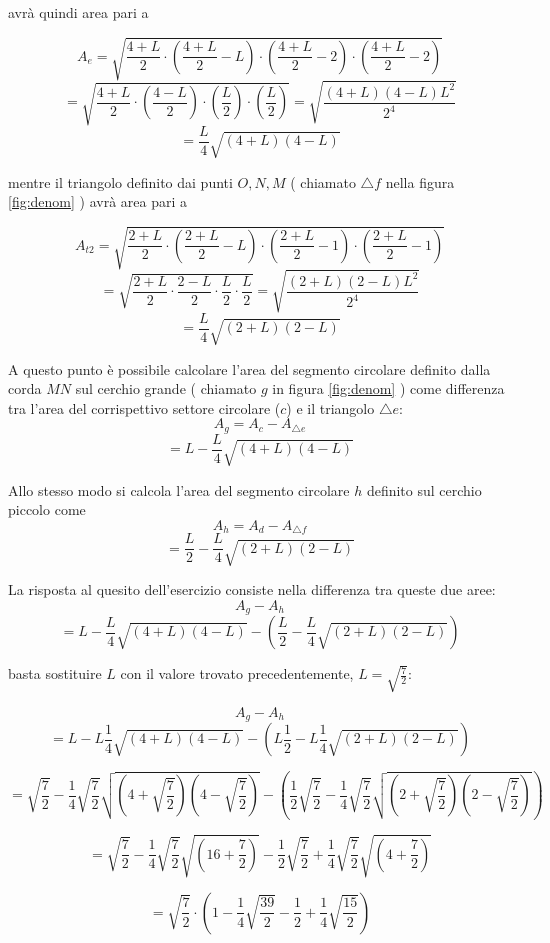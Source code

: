 avrà quindi area pari a 

\[A_{e}=\sqrt{
\frac{4+L}{2}
\cdot\left(\frac{4+L}{2}-L\right)
\cdot\left(\frac{4+L}{2}-2\right)
\cdot\left(\frac{4+L}{2}-2\right)
}\]
\[=\sqrt{
\frac{4+L}{2}
\cdot\left(\frac{4-L}{2}\right)
\cdot\left(\frac{L}{2}\right)
\cdot\left(\frac{L}{2}\right)
}
=\sqrt{
\frac{
(4+L)(4-L)L^2
}{2^4}
}\]
\[=\frac{L}{4}\sqrt{(4+L)(4-L)}\]

mentre il triangolo definito dai punti $O, N, M$
( chiamato $\triangle f$ nella figura \ref{fig:denom} )
avrà area pari a 


\[A_{t2}=\sqrt{
\frac{2+L}{2}
\cdot\left(\frac{2+L}{2}-L\right)
\cdot\left(\frac{2+L}{2}-1\right)
\cdot\left(\frac{2+L}{2}-1\right)
}\]
\[=\sqrt{
\frac{2+L}{2}
\cdot
\frac{2-L}{2}
\cdot
\frac{L}{2}
\cdot
\frac{L}{2}
}
=\sqrt{
\frac{
(2+L)(2-L)L^2
}{2^4}
}
\]
\[
=\frac{L}{4}
\sqrt{(2+L)(2-L)}
\]

A questo punto è possibile calcolare l'area del segmento circolare 
definito dalla corda $MN$ sul cerchio grande
( chiamato $g$ in figura \ref{fig:denom} ) 
come differenza tra l'area del corrispettivo settore circolare ($c$)
e il triangolo $\triangle e$:
\[  A_g= A_c - A_{\triangle e} \]
\[=L-\frac{L}{4}\sqrt{(4+L)(4-L)}\]

Allo stesso modo si calcola l'area del segmento circolare $h$
definito sul cerchio piccolo come 
\[A_{h}=A_d-A_{\triangle f}\]
\[=\frac{L}{2}-\frac{L}{4}
\sqrt{(2+L)(2-L)}\]

La risposta al quesito dell'esercizio consiste nella differenza tra queste due aree:
\[A_{g}-A_{h}\]
\[=L-\frac{L}{4}\sqrt{(4+L)(4-L)}-\left(\frac{L}{2}-\frac{L}{4}
\sqrt{(2+L)(2-L)}\right)\]

basta sostituire $L$ con il valore trovato precedentemente,
$L=\sqrt{\frac{7}{2}}$:

\[A_{g}-A_{h}\]
\[
=L
-L\frac{1}{4}\sqrt{(4+L)(4-L)}
-\left(L\frac{1}{2}
-L\frac{1}{4}\sqrt{(2+L)(2-L)}\right)
\]

\[
=\sqrt{\frac{7}{2}}
-\frac{1}{4}\sqrt{\frac{7}{2}}\sqrt{\left(4+\sqrt{\frac{7}{2}}\right)\left(4-\sqrt{\frac{7}{2}}\right)}
-\left(\frac{1}{2}\sqrt{\frac{7}{2}}
-\frac{1}{4}\sqrt{\frac{7}{2}}\sqrt{\left(2+\sqrt{\frac{7}{2}}\right)\left(2-\sqrt{\frac{7}{2}}\right)}\right)
\]


\[
=\sqrt{\frac{7}{2}}
-\frac{1}{4}\sqrt{\frac{7}{2}}
\sqrt{\left(16+\frac{7}{2}\right)}
-\frac{1}{2}\sqrt{\frac{7}{2}}
+\frac{1}{4}\sqrt{\frac{7}{2}}\sqrt{\left(4+\frac{7}{2}\right)}
\]

\[
=\sqrt{\frac{7}{2}}\cdot\left(
1-\frac{1}{4}
\sqrt{\frac{39}{2}}
-\frac{1}{2}
+\frac{1}{4}\sqrt{\frac{15}{2}}
\right)
\]

